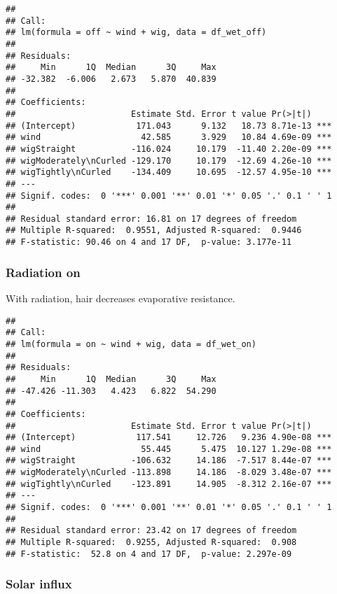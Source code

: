 \documentclass[
]{article}
\begin{document}
\begin{verbatim}
## 
## Call:
## lm(formula = off ~ wind + wig, data = df_wet_off)
## 
## Residuals:
##     Min      1Q  Median      3Q     Max 
## -32.382  -6.006   2.673   5.870  40.839 
## 
## Coefficients:
##                       Estimate Std. Error t value Pr(>|t|)    
## (Intercept)            171.043      9.132   18.73 8.71e-13 ***
## wind                    42.585      3.929   10.84 4.69e-09 ***
## wigStraight           -116.024     10.179  -11.40 2.20e-09 ***
## wigModerately\nCurled -129.170     10.179  -12.69 4.26e-10 ***
## wigTightly\nCurled    -134.409     10.695  -12.57 4.95e-10 ***
## ---
## Signif. codes:  0 '***' 0.001 '**' 0.01 '*' 0.05 '.' 0.1 ' ' 1
## 
## Residual standard error: 16.81 on 17 degrees of freedom
## Multiple R-squared:  0.9551, Adjusted R-squared:  0.9446 
## F-statistic: 90.46 on 4 and 17 DF,  p-value: 3.177e-11
\end{verbatim}

\hypertarget{radiation-on-1}{%
\subsubsection{Radiation on}\label{radiation-on-1}}

With radiation, hair decreases evaporative resistance.

\begin{verbatim}
## 
## Call:
## lm(formula = on ~ wind + wig, data = df_wet_on)
## 
## Residuals:
##     Min      1Q  Median      3Q     Max 
## -47.426 -11.303   4.423   6.822  54.290 
## 
## Coefficients:
##                       Estimate Std. Error t value Pr(>|t|)    
## (Intercept)            117.541     12.726   9.236 4.90e-08 ***
## wind                    55.445      5.475  10.127 1.29e-08 ***
## wigStraight           -106.632     14.186  -7.517 8.44e-07 ***
## wigModerately\nCurled -113.898     14.186  -8.029 3.48e-07 ***
## wigTightly\nCurled    -123.891     14.905  -8.312 2.16e-07 ***
## ---
## Signif. codes:  0 '***' 0.001 '**' 0.01 '*' 0.05 '.' 0.1 ' ' 1
## 
## Residual standard error: 23.42 on 17 degrees of freedom
## Multiple R-squared:  0.9255, Adjusted R-squared:  0.908 
## F-statistic:  52.8 on 4 and 17 DF,  p-value: 2.297e-09
\end{verbatim}

\hypertarget{solar-influx-1}{%
\subsubsection{Solar influx}\label{solar-influx-1}}
\end{document}
